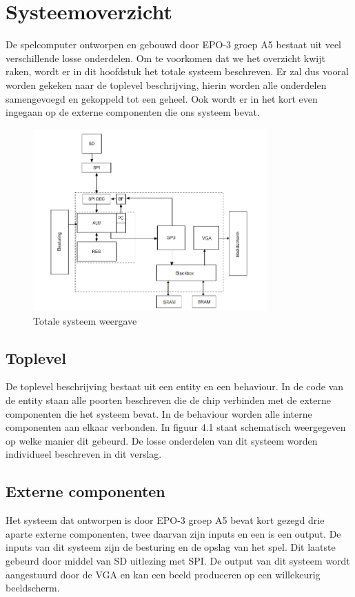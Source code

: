 \documentclass[oneside,dutch]{tudelft-report}
\begin{document}
\chapter{Systeemoverzicht}
De spelcomputer ontworpen en gebouwd door EPO-3 groep A5 bestaat uit veel verschillende losse onderdelen. Om te voorkomen dat we het overzicht kwijt raken, wordt er in dit hoofdstuk het totale systeem beschreven. Er zal dus vooral worden gekeken naar de toplevel beschrijving, hierin worden alle onderdelen samengevoegd en gekoppeld tot een geheel. Ook wordt er in het kort even ingegaan op de externe componenten die ons systeem bevat.

\begin{figure}[H]
\center
\includegraphics[width=9cm]{hele-systeem}
\caption{Totale systeem weergave}
\label{Systeemoverzicht}
\end{figure}

\section{Toplevel}
De toplevel beschrijving bestaat uit een entity en een behaviour. In de code van de entity staan alle poorten beschreven die de chip verbinden met de externe componenten die het systeem bevat. In de behaviour worden alle interne componenten aan elkaar verbonden. In figuur 4.1 staat schematisch weergegeven op welke manier dit gebeurd. De losse onderdelen van dit systeem worden individueel beschreven in dit verslag.

\section{Externe componenten}
Het systeem dat ontworpen is door EPO-3 groep A5 bevat kort gezegd drie aparte externe componenten, twee daarvan zijn inputs en een is een output. De inputs van dit systeem zijn de besturing en de opslag van het spel. Dit laatste gebeurd door middel van SD uitlezing met SPI. De output van dit systeem wordt aangestuurd door de VGA en kan een beeld produceren op een willekeurig beeldscherm.
\end{document}
